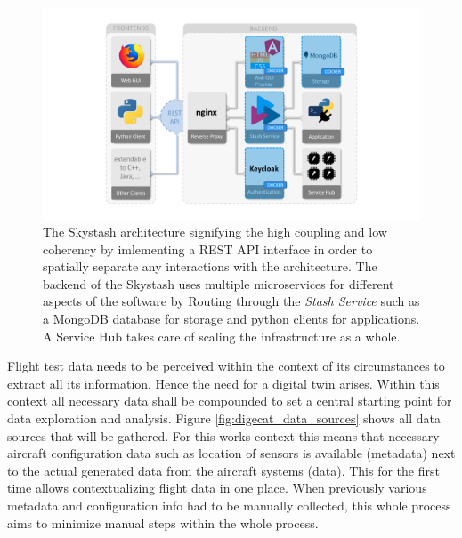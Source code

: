 \begin{figure}[h]
    \centering
    \includegraphics[width=\textwidth]{03_figures/stash_architecture}
    \caption[The Skystash architecture \cite{arts_digital_2022}]{The Skystash architecture signifying the high coupling and low coherency by imlementing a REST API interface in order to spatially separate any interactions with the architecture. The backend of the Skystash uses multiple microservices for different aspects of the software by Routing through the \textit{Stash Service} such as a MongoDB database for storage and python clients for applications. A Service Hub takes care of scaling the infrastructure as a whole. \cite{arts_digital_2022}}
    \label{fig:skystash_architecture}
\end{figure}

Flight test data needs to be perceived within the context of its circumstances to extract all its information. Hence the need for a digital twin arises. Within this context all necessary data shall be compounded to set a central starting point for data exploration and analysis. Figure \ref{fig:digecat_data_sources} shows all data sources that will be gathered. For this works context this means that necessary aircraft configuration data such as location of sensors is available (metadata) next to the actual generated data from the aircraft systems (data). This for the first time allows contextualizing flight data in one place. When previously various metadata and configuration info had to be manually collected, this whole process aims to minimize manual steps within the whole process. \cite{arts_digital_2022}

